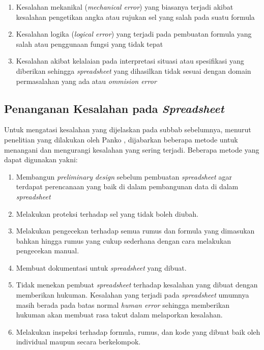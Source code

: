     \begin{enumerate}
        \item Kesalahan mekanikal (\textit{mechanical error}) yang biasanya terjadi akibat kesalahan pengetikan angka atau rujukan sel yang salah pada suatu formula
        \item Kesalahan logika (\textit{logical error}) yang terjadi pada pembuatan formula yang salah atau penggunaan fungsi yang tidak tepat
        \item Kesalahan akibat kelalaian pada interpretasi situasi atau spesifikasi yang diberikan sehingga \textit{spreadsheet} yang dihasilkan tidak sesuai dengan domain permasalahan yang ada atau \textit{ommision error} \parencite{Powell2009}
    \end{enumerate}

\subsection{Penanganan Kesalahan pada \textit{Spreadsheet}}
Untuk mengatasi kesalahan yang dijelaskan pada subbab sebelumnya, menurut penelitian yang dilakukan oleh Panko \parencite{Panko1998}, dijabarkan beberapa metode untuk menangani dan mengurangi kesalahan yang sering terjadi. Beberapa metode yang dapat digunakan yakni:

    \begin{enumerate}
        \item Membangun \textit{preliminary design} sebelum pembuatan \textit{spreadsheet} agar terdapat perencanaan yang baik di dalam pembangunan data di dalam \textit{spreadsheet}
        \item Melakukan proteksi terhadap sel yang tidak boleh diubah.
        \item Melakukan pengecekan terhadap semua rumus dan formula yang dimasukan bahkan hingga rumus yang cukup sederhana dengan cara melakukan pengecekan manual.
        \item Membuat dokumentasi untuk \textit{spreadsheet} yang dibuat.
        \item Tidak menekan pembuat \textit{spreadsheet} terhadap kesalahan yang dibuat dengan memberikan hukuman. Kesalahan yang terjadi pada \textit{spreadsheet} umumnya masih berada pada batas normal \textit{human error} sehingga memberikan hukuman akan membuat rasa takut dalam melaporkan kesalahan.
        \item Melakukan inspeksi terhadap formula, rumus, dan kode yang dibuat baik oleh individual maupun secara berkelompok.
    \end{enumerate}


